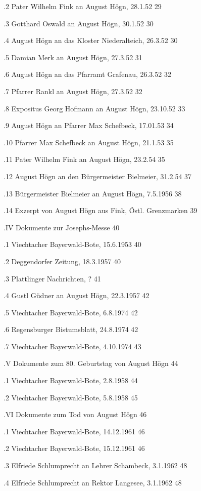 \documentclass{book}
\begin{document}
.2 Pater Wilhelm Fink an August Högn, 28.1.52   29

.3 Gotthard Oswald an August Högn, 30.1.52  30

.4 August Högn an das Kloster Niederalteich, 26.3.52    30

.5 Damian Merk an August Högn, 27.3.52  31

.6 August Högn an das Pfarramt Grafenau, 26.3.52    32

.7 Pfarrer Rankl an August Högn, 27.3.52    32

.8 Expositus Georg Hofmann an August Högn, 23.10.52 33

.9 August Högn an Pfarrer Max Schefbeck, 17.01.53   34

.10 Pfarrer Max Schefbeck an August Högn, 21.1.53   35

.11 Pater Wilhelm Fink an August Högn, 23.2.54  35

.12 August Högn an den Bürgermeister Bielmeier, 31.2.54 37

.13 Bürgermeister Bielmeier an August Högn, 7.5.1956    38

.14 Exzerpt von August Högn aus Fink, Östl. Grenzmarken 39

.IV Dokumente zur Josephs-Messe 40

.1 Viechtacher Bayerwald-Bote, 15.6.1953    40

.2 Deggendorfer Zeitung, 18.3.1957  40

.3 Plattlinger Nachrichten, ?   41

.4 Gustl Güdner an August Högn, 22.3.1957   42

.5 Viechtacher Bayerwald-Bote, 6.8.1974 42

.6 Regensburger Bistumsblatt, 24.8.1974 42

.7 Viechtacher Bayerwald-Bote, 4.10.1974    43

.V Dokumente zum 80. Geburtstag von August Högn 44

.1 Viechtacher Bayerwald-Bote, 2.8.1958     44

.2 Viechtacher Bayerwald-Bote, 5.8.1958 45

.VI Dokumente zum Tod von August Högn   46

.1 Viechtacher Bayerwald-Bote, 14.12.1961   46

.2 Viechtacher Bayerwald-Bote, 15.12.1961   46

.3 Elfriede Schlumprecht an Lehrer Schambeck, 3.1.1962  48

.4 Elfriede Schlumprecht an Rektor Langesee, 3.1.1962   48
\end{document}
